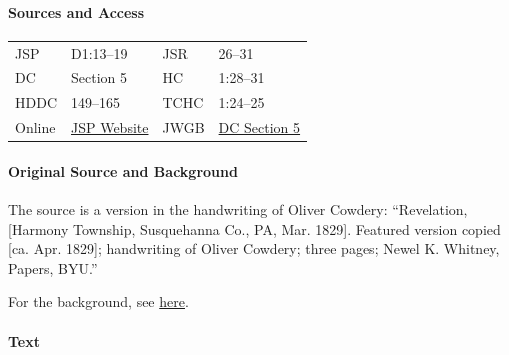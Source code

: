 			\paragraph{Sources and Access}

				\begin{tabular}{p{1in}p{1.5in}p{1in}p{1.5in}}
				JSP	 	& D1:13--19		& JSR 		& 26--31	 \\  
				DC	 	& Section 5 	& HC 		& 1:28--31	 \\
				HDDC 	& 149--165 		& TCHC 		& 1:24--25	 \\
				Online	& \href{https://www.josephsmithpapers.org/paper-summary/revelation-march-1829-dc-5/1}{JSP Website} & 
				JWGB	& \hyperref[DC5]{DC Section 5} \\
				\end{tabular}
			
			\paragraph{Original Source and Background}
			
				The source is a version in the handwriting of Oliver Cowdery: ``Revelation, [Harmony Township, Susquehanna Co., PA, Mar. 1829]. Featured version copied [ca. Apr. 1829]; handwriting of Oliver Cowdery; three pages; Newel K. Whitney, Papers, BYU.''
				
				For the background, see \hyperref[DC5-HB]{here}.
			
			\paragraph{Text}
			
